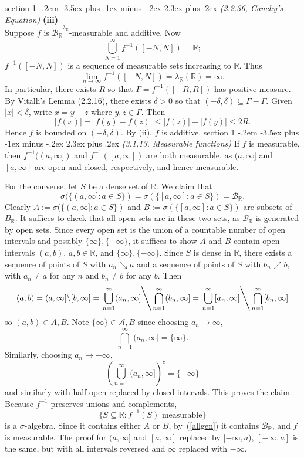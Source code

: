 \documentclass[12pt]{article}
\makeatletter
\theoremstyle{norm}
\newcommand{\R}[0]{\mathbb{R}}
\providecommand{\cal}[1]{\mathcal{#1}}
\renewcommand{\cal}[1]{\mathcal{#1}}
\newcommand{\subeq}[0]{\subseteq}
\newcommand{\Ga}[0]{\Gamma}
\newcommand{\de}[0]{\delta}
\newcommand{\la}[0]{\lambda}
\newcommand{\si}[0]{\sigma}
\newcommand{\pa}[1]{\left( {#1} \right)}
\newcommand{\subprob}[1]{\noindent\textbf{#1}\\}
\newcommand{\bs}[0]{\backslash}
\newcommand{\sia}[0]{ $\si$-algebra}
\newcommand{\ol}[1]{\overline{#1}}
\newcommand{\iy}[0]{\infty}
\newenvironment{problem}{\@startsection
       {section}
       {1}
       {-.2em}
       {-3.5ex plus -1ex minus -.2ex}
       {2.3ex plus .2ex}
       {\pagebreak[3]%
       \large\bf\noindent{Problem }
       }
       }
       {%
       }
\makeatother
\begin{document}
\begin{problem}{\it (2.2.36, Cauchy's Equation)}
\subprob{(iii)}
Suppose $f$ is $\ol{\cal B_{\R}}^{\la_\R}$-measurable and additive. Now
\[
\bigcup_{N=1}^{\iy} f^{-1}([-N,N])=\R;
\]
$f^{-1}([-N,N])$ is a sequence of measurable sets increasing to $\R$. Thus
\[
\lim_{n\to \iy} f^{-1}([-N,N])=\la_{\R}(\R)=\iy.
\]
In particular, there exists $R$ so that $\Ga=f^{-1}([-R,R])$ has positive measure. 
By Vitalli's Lemma (2.2.16), there exists $\de>0$ so that $(-\de,\de)\subeq \Ga-\Ga$.
Given $|x|<\de$, write $x=y-z$ where $y,z\in \Ga$. Then
\[
|f(x)|=|f(y)-f(z)|\le |f(z)|+|f(y)|\leq 2R.
\]
Hence $f$ is bounded on $(-\de,\de)$. By (ii), $f$ is additive.
\end{problem}
\begin{problem}{\it (3.1.13, Measurable functions)}
If $f$ is measurable, then $f^{-1}((a,\iy])$ and $f^{-1}([a,\iy])$ are both measurable, as $(a,\iy]$ and $[a,\iy]$ are open and closed, respectively, and hence measurable.

For the converse, let $S$ be a dense set of $\R$. We claim that 
\begin{equation}\label{allgen}
\si(\{(a,\iy]:a\in S\})=\si(\{[a,\iy]:a\in S\})=\cal B_{\R}.
\end{equation}
Clearly $A:=\si(\{(a,\iy]:a\in S\})$ and $B:=\si(\{[a,\iy]:a\in S\})$ are subsets of $B_{\R}$.
It suffices to check that all open sets are in these two sets, as $\cal B_{\R}$ is generated by open sets. 
Since every open set is the union of a countable number of open intervals and possibly $\{\iy\},\{-\iy\}$, it suffices to show $A$ and $B$ contain open intervals $(a,b)$, $a,b\in \R$, and $\{\iy\},\{-\iy\}$.
Since $S$ is dense in $\R$, there exists a sequence of points of $S$ with $a_n\searrow a$ and a sequence of points of $S$ with $b_n\nearrow b$, with $a_n\neq a$ for any $n$ and $b_n\neq b$ for any $b$. 
Then
\[
(a,b)=(a,\iy]\bs [b,\iy]=\left.\bigcup_{n=1}^{\iy} (a_n,\iy]\right\backslash\bigcap_{n=1}^{\iy} (b_n,\iy]
=
\left.\bigcup_{n=1}^{\iy} [a_n,\iy]\right\backslash\bigcap_{n=1}^{\iy} [b_n,\iy]
\]
so $(a,b)\in A,B$. Note $\{\iy\}\in \cal A,B$ since choosing $a_n\to \iy$,
\[
\bigcap_{n=1}^{\iy} (a_n,\iy]=\{\iy\}.
\]
Similarly, choosing $a_n\to -\iy$,
\[
\pa{\bigcup_{n=1}^{\iy} (a_n,\iy]}^c=
\{-\iy\}
\]
and similarly with half-open replaced by closed intervals. 
This proves the claim. Because $f^{-1}$ preserves unions and complements,
\[
\{S\subeq \ol{\R}: f^{-1}(S)\text{ measurable}\}
\]
is a \sia. Since it contains either $A$ or $B$, by~(\ref{allgen}) it contains $\cal B_{\R}$, and $f$ is measurable. The proof for $(a,\iy]$ and $[a,\iy]$ replaced by $[-\iy,a)$, $[-\iy,a]$ is the same, but with all intervals reversed and $\iy$ replaced with $-\iy$.


\end{problem}
\end{document}
